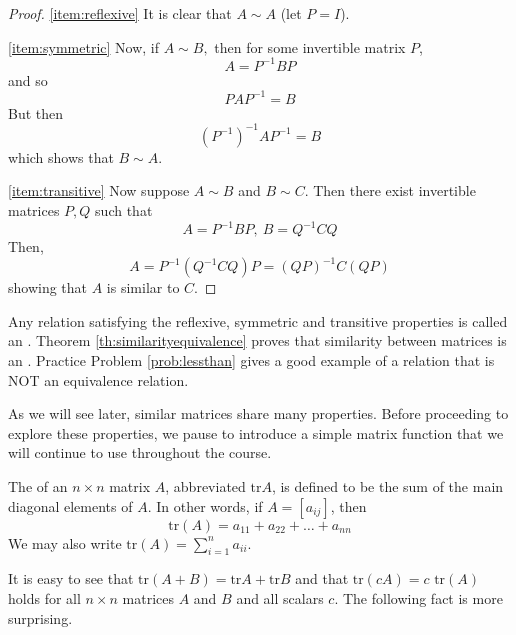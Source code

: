 \documentclass{ximera}
\begin{document}
\begin{proof}
\ref{item:reflexive} It is clear that $A\sim A$ (let $P=I$).

\ref{item:symmetric}
Now, if $A\sim B,$ then for some invertible matrix $P$,
\begin{equation*}
A=P^{-1}BP
\end{equation*}
and so
\begin{equation*}
PAP^{-1}=B
\end{equation*}
But then
\begin{equation*}
\left( P^{-1}\right) ^{-1}AP^{-1}=B
\end{equation*}
which shows that $B\sim A$.

\ref{item:transitive}
Now suppose $A\sim B$ and $B\sim C$. Then there exist invertible matrices
$P,Q$ such that
\begin{equation*}
A=P^{-1}BP,\ B=Q^{-1}CQ
\end{equation*}
Then,
\begin{equation*}
A=P^{-1} \left( Q^{-1}CQ \right)P=\left( QP\right) ^{-1}C\left( QP\right)
\end{equation*}
showing that $A$ is similar to $C$.
\end{proof}

Any relation satisfying the reflexive, symmetric and transitive properties is called an  .  Theorem \ref{th:similarityequivalence} proves that similarity between matrices is an .  Practice Problem \ref{prob:lessthan} gives a good example of a relation that is NOT an equivalence relation.

As we will see later, similar matrices share many properties. 
 Before proceeding to explore these properties, we pause to introduce a simple matrix function that we will continue to use throughout the course.  %

\begin{definition}
The  of an $n \times n$ matrix $A$, abbreviated $\mbox{tr} A$, is defined to be the sum of the main diagonal elements of $A$.  In other words, if $ A = [a_{ij}]$, then $$\mbox{tr}(A) = a_{11} + a_{22} + \dots + a_{nn}$$  We may also write $\mbox{tr}(A) =\sum_{i=1}^n a_{ii}$.
\end{definition}

It is easy to see that $\mbox{tr}(A + B) = \mbox{tr} A + \mbox{tr} B$ and that $\mbox{tr}(cA) = c \mbox{ tr}(A)$ holds for all $n \times n$ matrices $A$ and $B$ and all scalars $c$. The following fact is more surprising.
\end{document}
